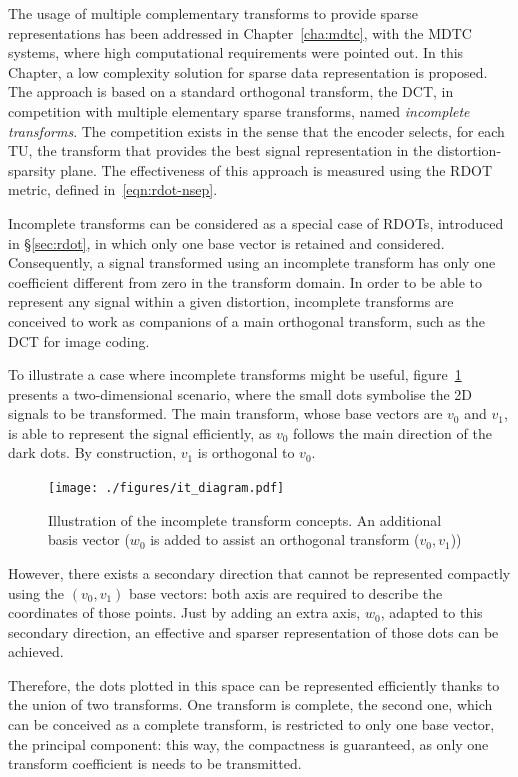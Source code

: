 \documentclass[11pt,a4paper,openright,twoside]{book}
\numberwithin{equation}{section} %
\numberwithin{figure}{section} %
\numberwithin{table}{section} %
\begin{document}
The usage of multiple complementary transforms to provide sparse
representations has been addressed in Chapter~\ref{cha:mdtc}, with the
\ac{MDTC} systems, where high computational requirements were pointed out.
In this Chapter, a low complexity solution for sparse data representation is
proposed.
The approach is based on a standard orthogonal transform, the \acf{DCT}, in
competition with multiple elementary sparse transforms, named \emph{incomplete
transforms}.
The competition exists in the sense that the encoder selects, for each
\ac{TU}, the transform that provides the best signal representation in the
distortion-sparsity plane.
The effectiveness of this approach is measured using the \ac{RDOT} metric,
defined in~\ref{eqn:rdot-nsep}.

Incomplete transforms can be considered as a special case of \acfp{RDOT},
introduced in \S\ref{sec:rdot}, in which
only one base vector is retained and considered.
Consequently, a signal transformed using an incomplete transform has only one
coefficient different from zero in the transform domain.
In order to be able to represent any signal within a given distortion,
incomplete transforms are conceived to work as companions of a main orthogonal
transform, such as the \ac{DCT} for image coding.

To illustrate a case where incomplete transforms might be useful,
figure~\ref{fig:it_diagram} presents a two-dimensional scenario, where the
small dots symbolise the 2D signals to be transformed.
The main transform, whose base vectors are $v_0$ and $v_1$, is able to
represent the signal efficiently, as $v_0$ follows the main direction of the
dark dots.
By construction, $v_1$ is orthogonal to $v_0$.

\begin{figure}[tp]
	\centering
	\texttt{[image: ./figures/it\_diagram.pdf]}
	\caption[Illustration of the incomplete transform concepts]
	{Illustration of the incomplete transform concepts.
	An additional basis vector ($w_0$ is added to assist an orthogonal
	transform ($v_0,v_1$))}
	\label{fig:it_diagram}
\end{figure}

However, there exists a secondary direction that cannot be represented
compactly using the $(v_0,v_1)$ base vectors:
both axis are required to describe the coordinates of those points.
Just by adding an extra axis, $w_0$, adapted to this secondary direction, an
effective and sparser representation of those dots can be achieved.

Therefore, the dots plotted in this space can be represented efficiently thanks
to the union of two transforms.
One transform is complete, the second one, which can be conceived as a
complete transform, is restricted to only one base vector, the principal
component:
this way, the compactness is guaranteed, as only one transform coefficient is
needs to be transmitted.
\end{document}
